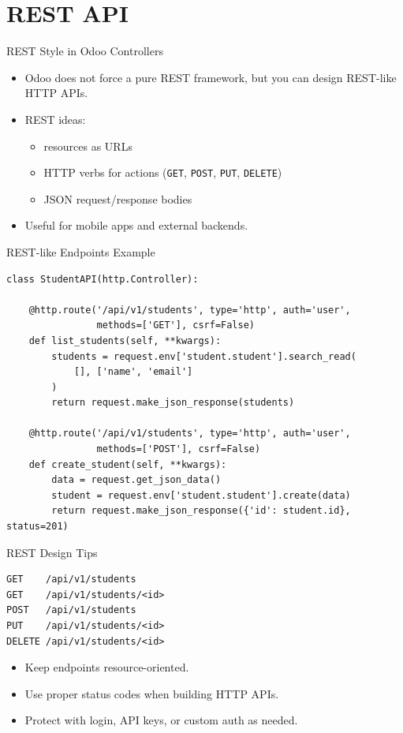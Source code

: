 \section{REST API}

\begin{frame}{REST Style in Odoo Controllers}
	\begin{itemize}
		\item Odoo does not force a pure REST framework, but you can design REST-like HTTP APIs.
		\item REST ideas:
		\begin{itemize}
			\item resources as URLs
			\item HTTP verbs for actions (\texttt{GET}, \texttt{POST}, \texttt{PUT}, \texttt{DELETE})
			\item JSON request/response bodies
		\end{itemize}
		\item Useful for mobile apps and external backends.
	\end{itemize}
\end{frame}

\begin{frame}[fragile]{REST-like Endpoints Example}
\begin{lstlisting}
class StudentAPI(http.Controller):

	@http.route('/api/v1/students', type='http', auth='user',
				methods=['GET'], csrf=False)
	def list_students(self, **kwargs):
		students = request.env['student.student'].search_read(
			[], ['name', 'email']
		)
		return request.make_json_response(students)

	@http.route('/api/v1/students', type='http', auth='user',
				methods=['POST'], csrf=False)
	def create_student(self, **kwargs):
		data = request.get_json_data()
		student = request.env['student.student'].create(data)
		return request.make_json_response({'id': student.id}, status=201)
\end{lstlisting}
\end{frame}

\begin{frame}[fragile]{REST Design Tips}
\begin{lstlisting}
GET    /api/v1/students
GET    /api/v1/students/<id>
POST   /api/v1/students
PUT    /api/v1/students/<id>
DELETE /api/v1/students/<id>
\end{lstlisting}
	\begin{itemize}
		\item Keep endpoints resource-oriented.
		\item Use proper status codes when building HTTP APIs.
		\item Protect with login, API keys, or custom auth as needed.
	\end{itemize}
\end{frame}

